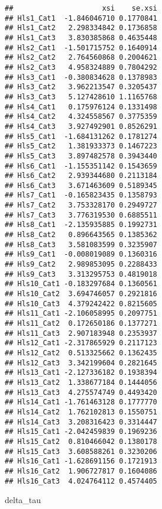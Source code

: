 \documentclass[
]{book}
\newenvironment{Shaded}{\begin{snugshade}}{\end{snugshade}}
\newcommand{\NormalTok}[1]{#1}
\begin{document}
\begin{verbatim}
##                     xsi    se.xsi
## Hls1_Cat1  -1.846046710 0.1770841
## Hls1_Cat2   2.298334842 0.1736858
## Hls1_Cat3   3.830385868 0.4635448
## Hls2_Cat1  -1.501715752 0.1640914
## Hls2_Cat2   2.764560868 0.2004621
## Hls2_Cat3   4.958324889 0.7804292
## Hls3_Cat1  -0.380834628 0.1378983
## Hls3_Cat2   3.962213547 0.3205437
## Hls3_Cat3   5.127428610 1.1165768
## Hls4_Cat1   0.175976124 0.1331498
## Hls4_Cat2   4.324558567 0.3775359
## Hls4_Cat3   3.927492901 0.8526291
## Hls5_Cat1  -1.684131262 0.1781274
## Hls5_Cat2   1.381933373 0.1467223
## Hls5_Cat3   3.897482578 0.3943440
## Hls6_Cat1  -1.155351142 0.1543659
## Hls6_Cat2   2.939344680 0.2113184
## Hls6_Cat3   3.671463609 0.5189345
## Hls7_Cat1  -0.165823435 0.1358793
## Hls7_Cat2   3.753328170 0.2949727
## Hls7_Cat3   3.776319530 0.6885511
## Hls8_Cat1  -2.135935885 0.1992731
## Hls8_Cat2   0.896643565 0.1385362
## Hls8_Cat3   3.581083599 0.3235907
## Hls9_Cat1  -0.008019089 0.1360316
## Hls9_Cat2   2.989853095 0.2288433
## Hls9_Cat3   3.313295753 0.4819018
## Hls10_Cat1 -0.183297684 0.1360561
## Hls10_Cat2  3.694746057 0.2921816
## Hls10_Cat3  4.379242422 0.8215605
## Hls11_Cat1 -2.106058995 0.2097751
## Hls11_Cat2  0.172650186 0.1377271
## Hls11_Cat3  2.907183948 0.2353937
## Hls12_Cat1 -2.317865929 0.2117123
## Hls12_Cat2  0.513325662 0.1362435
## Hls12_Cat3  3.342199604 0.2821645
## Hls13_Cat1 -2.127336182 0.1938394
## Hls13_Cat2  1.338677184 0.1444056
## Hls13_Cat3  4.275574749 0.4493420
## Hls14_Cat1 -1.761463128 0.1777770
## Hls14_Cat2  1.762102813 0.1550751
## Hls14_Cat3  3.208316423 0.3314447
## Hls15_Cat1 -2.042459839 0.1969236
## Hls15_Cat2  0.810466042 0.1380178
## Hls15_Cat3  3.608588261 0.3230206
## Hls16_Cat1 -1.628691156 0.1721913
## Hls16_Cat2  1.906727817 0.1604086
## Hls16_Cat3  4.024764112 0.4574405
\end{verbatim}

\begin{Shaded}
\begin{Highlighting}[]
\NormalTok{delta\_tau}
\end{Highlighting}
\end{Shaded}
\end{document}
